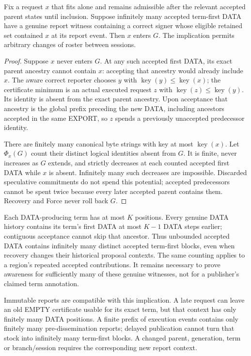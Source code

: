 \begin{proposition}
\label{prop:v38-request-inclusion}
Fix a request $x$ that fits alone and remains admissible after the
relevant accepted parent states until inclusion. Suppose infinitely
many accepted term-first DATA have a genuine report witness containing
a correct signer whose eligible retained set contained $x$ at its
report event. Then $x$ enters $G$. The implication permits arbitrary
changes of roster between sessions.
\end{proposition}
\begin{proof}
Suppose $x$ never enters $G$. At any such accepted first DATA, its exact
parent ancestry cannot contain $x$: accepting that ancestry would
already include $x$. The aware correct reporter chooses $y$ with
$\operatorname{key}(y)\le\operatorname{key}(x)$; the certificate minimum
is an actual executed request $z$ with
$\operatorname{key}(z)\le\operatorname{key}(y)$.
Its identity is absent from the exact parent ancestry. Upon acceptance
that ancestry is the global prefix preceding the new DATA, including
ancestors accepted in the same EXPORT, so $z$ spends a previously
unaccepted predecessor identity.

There are finitely many canonical byte strings with key at most
$\operatorname{key}(x)$. Let $\Phi_x(G)$ count their distinct logical
identities absent from $G$. It is finite, never increases as $G$
extends, and strictly decreases at each counted accepted first DATA
while $x$ is absent. Infinitely many such decreases are impossible.
Discarded speculative commitments do not spend this potential; accepted
predecessors cannot be spent twice because every later accepted parent
contains them. Recovery and Force never roll back $G$.
\end{proof}

Each DATA-producing term has at most $K$ positions. Every genuine DATA
history contains its term's first DATA at most $K-1$ DATA steps earlier;
contiguous acceptance cannot skip that ancestor. Thus unbounded accepted
DATA contains infinitely many distinct accepted term-first blocks,
even when recovery changes their historical proposal contexts. The
same counting applies to a region's repeated accepted contributions.
It remains necessary to prove awareness for sufficiently many of these
genuine witnesses, not for a publisher's claimed term annotation.

Immutable reports are compatible with this implication. A late request
can leave an old EMPTY certificate usable for its exact term, but that
context has only finitely many DATA positions. A finite prefix of
execution events contains only finitely many pre-dissemination reports;
delayed publication cannot turn that stock into infinitely many
term-first blocks. A changed parent, generation, term or branch/session
requires the corresponding new report context.

